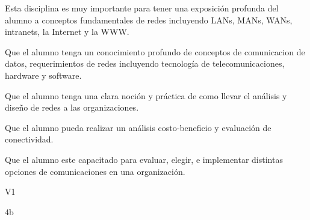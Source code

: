 \begin{syllabus}


\begin{justification}
	Esta disciplina es muy importante para tener una exposición profunda del alumno a conceptos fundamentales de redes incluyendo LANs, MANs, WANs, intranets, la Internet y la WWW.
	\end{justification}
	
	\begin{goals}
	\item Que el alumno tenga un conocimiento profundo de conceptos de comunicacion de datos, requerimientos de redes incluyendo tecnología de telecomunicaciones, hardware y software.
	\item Que el alumno tenga una clara noción y práctica de como llevar el análisis y diseño de redes a las organizaciones.
	\item Que el alumno pueda realizar un análisis costo-beneficio y evaluación de conectividad.
	\item Que el alumno este capacitado para evaluar, elegir, e implementar distintas opciones de comunicaciones en una organización.
	\end{goals}
	
	\begin{outcomes}{V1}
		\item {}
		\item {}
		\item {}
		\item {}
		\item {}
		\item {}
	\end{outcomes}
	
	\begin{unit}{\LUTHREETWODef}{}{\LUTHREETWOBib}{4}{b}
	   \begin{topics}
				\item \ITFIVETopicONExFIVExTWO
				\item \ITFIVETopicONExFIVExFOUR
				\item \ITFIVETopicONExFIVExSIX
	   \end{topics}
		\LUTHREETWOGoal
	\end{unit}
	

\end{syllabus}
